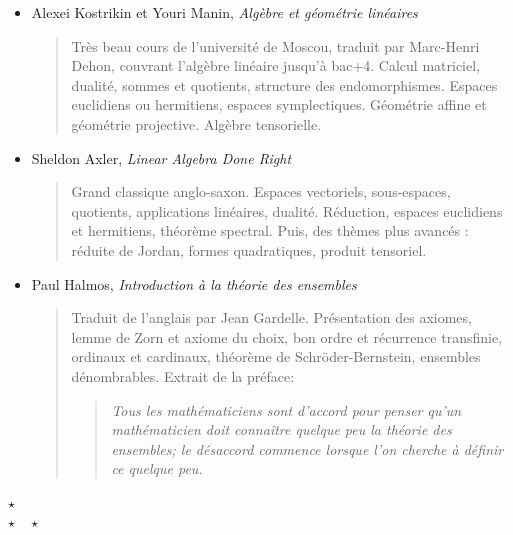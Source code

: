 \documentclass{article}
\def\separateur{\begin{center}
$\star$\\
$\star\quad\star$
\end{center}}
\begin{document}
\begin{itemize}
\item Alexei Kostrikin et Youri Manin, \emph{Algèbre et géométrie linéaires}
\begin{quote}
Très beau cours de l'université de Moscou, traduit par Marc-Henri Dehon, couvrant l'algèbre linéaire jusqu'à bac+4. Calcul matriciel, dualité, sommes et quotients, structure des endomorphismes. Espaces euclidiens ou hermitiens, espaces symplectiques. Géométrie affine et géométrie projective. Algèbre tensorielle.
\end{quote}
\item Sheldon Axler, \emph{Linear Algebra Done Right}
\begin{quote}
Grand classique anglo-saxon. Espaces vectoriels, sous-espaces, quotients, applications linéaires, dualité. Réduction, espaces euclidiens et hermitiens, théorème spectral. Puis, des thèmes plus avancés :  réduite de Jordan, formes quadratiques, produit tensoriel.
\end{quote}
\item Paul Halmos, \emph{Introduction à la théorie des ensembles}
\begin{quote}
Traduit de l'anglais par Jean Gardelle. Présentation des axiomes, lemme de Zorn et axiome du choix, bon ordre et récurrence transfinie, ordinaux et cardinaux, théorème de Schröder-Bernstein, ensembles dénombrables. Extrait de la préface:
\begin{quote}
\emph{\og Tous les mathématiciens sont d'accord pour penser qu'un mathématicien doit connaître quelque peu la théorie des ensembles; le désaccord commence lorsque l'on cherche à définir ce quelque peu.\fg}
\end{quote}
\end{quote}
\end{itemize}

\separateur
\end{document}
